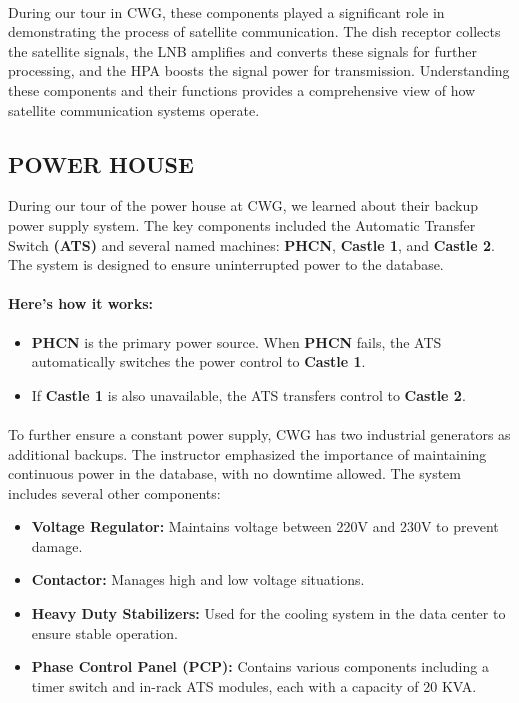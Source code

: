 \documentclass[a4paper,12pt]{report}
\begin{document}
\paragraph{}
During our tour in CWG, these components played a significant role in demonstrating the process of satellite communication. The dish receptor collects the satellite signals, the LNB amplifies and converts these signals for further processing, and the HPA boosts the signal power for transmission. Understanding these components and their functions provides a comprehensive view of how satellite communication systems operate.

\subsection[Power house]{POWER HOUSE}
During our tour of the power house at CWG, we learned about their backup power supply system. The key components included the Automatic Transfer Switch \textbf{(ATS)} and several named machines: \textbf{PHCN}, \textbf{Castle 1}, and \textbf{Castle 2}. The system is designed to ensure uninterrupted power to the database.

\paragraph{Here’s how it works:}
\begin{itemize}
    \item \textbf{PHCN} is the primary power source. When \textbf{PHCN} fails, the ATS automatically switches the power control to \textbf{Castle 1}.
    \item If \textbf{Castle 1} is also unavailable, the ATS transfers control to \textbf{Castle 2}.
\end{itemize}

\paragraph{}
To further ensure a constant power supply, CWG has two industrial generators as additional backups. The instructor emphasized the importance of maintaining continuous power in the database, with no downtime allowed.
The system includes several other components:
\begin{itemize}
    \item \textbf{Voltage Regulator:} Maintains voltage between 220V and 230V to prevent damage.
    \item \textbf{Contactor:} Manages high and low voltage situations.
    \item \textbf{Heavy Duty Stabilizers:} Used for the cooling system in the data center to ensure stable operation.
    \item \textbf{Phase Control Panel (PCP):} Contains various components including a timer switch and in-rack ATS modules, each with a capacity of 20 KVA.
\end{itemize}
\end{document}
